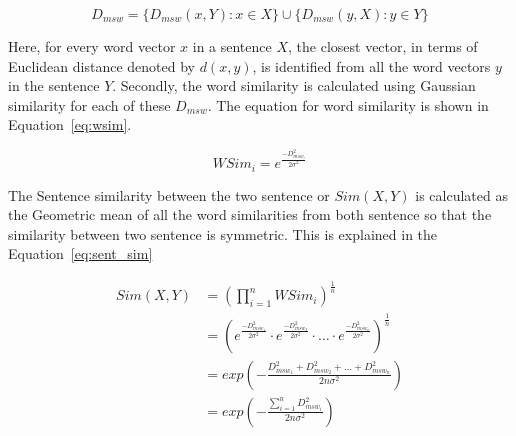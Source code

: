 \begin{equation}
    D_{msw} = \{D_{msw}(x,Y) : x \in X\} \cup \{D_{msw}(y,X) : y \in Y\}
    \label{eq:mswdset}
\end{equation}

Here, for every word vector $x$ in a sentence $X$, the closest vector, in terms of
Euclidean distance denoted by $d(x,y)$, is identified from all the word vectors $y$ in the sentence $Y$.
Secondly, the word similarity is calculated using Gaussian similarity for each of these $D_{msw}$.
The equation for word similarity is shown in Equation~\ref{eq:wsim}.

\begin{equation}\label{eq:wsim}
    WSim_i = e^{\frac{-D_{msw_i}^2}{2\sigma^2}}
\end{equation}

The Sentence similarity between the two sentence or $Sim(X,Y)$ is calculated as the Geometric
mean of all the word similarities from both sentence so that the similarity between two sentence is symmetric.
This is explained in the Equation~\ref{eq:sent_sim}

\begin{equation}\label{eq:sent_sim}
    \begin{split}
        Sim(X,Y)
        &=  \left(
                \prod_{i=1}^nWSim_i
            \right)^{\frac{1}{n}}\\
        &=  \left(
                e^{\frac{-D_{msw_1}^2}{2\sigma^2}}\cdot
                e^{\frac{-D_{msw_2}^2}{2\sigma^2}}\cdot
                    \ldots \cdot
                e^{\frac{-D_{msw_n}^2}{2\sigma^2}}
            \right)^\frac{1}{n}\\
        &=  exp\left(
                -\frac{D_{msw_1}^2+D_{msw_2}^2+\ldots+D_{msw_n}^2}{2n\sigma^2}
            \right)\\
        &=  exp\left(
                -\frac{\sum_{i=1}^nD_{msw_i}^2}{2n\sigma^2}
            \right)
    \end{split}
\end{equation}

